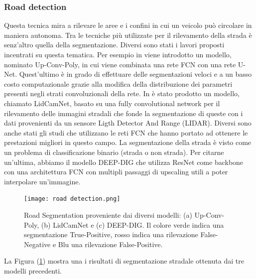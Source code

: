 \subsubsection{Road detection}
Questa tecnica mira a rilevare le aree e i confini in cui un veicolo può circolare 
in maniera autonoma. Tra le tecniche più utilizzate per il rilevamento 
della strada è senz'altro quella della segmentazione. Diversi sono stati i 
lavori proposti incentrati su questa tematica. Per esempio in \cite{Up-conv-Poly} viene 
introdotto un modello, nominato Up-Conv-Poly, in cui viene combinata una 
rete FCN con una rete U-Net. Quest'ultimo è in grado di effettuare delle 
segmentazioni veloci e a un basso costo computazionale grazie alla modifica 
della distribuzione dei parametri presenti negli strati convoluzionali della 
rete. In \cite{CALTAGIRONE2019125} è stato prodotto un modello, chiamato LidCamNet, basato su 
una fully convolutional network per il rilevamento delle immagini stradali 
che fonde la segmentazione di queste con i dati provenienti da un sensore 
Ligth Detector And Range (LIDAR). Diversi sono anche stati gli studi che 
utilizzano le reti FCN che hanno portato ad ottenere le prestazioni migliori 
in questo campo. La segmentazione della strada è visto come un problema di 
classificazione binario (strada o non strada). Per citarne un'ultima, abbiamo 
il modello DEEP-DIG \cite{DEEP-DIG} che utilizza ResNet come backbone con una 
architettura FCN con multipli passaggi di upscaling utili a poter interpolare 
un'immagine. 
\begin{figure}
    \centering
    \texttt{[image: road detection.png]}
    \centering
    \caption{Road Segmentation proveniente dai diversi modelli: (a) Up-Conv-Poly, (b) LidCamNet e (c) DEEP-DIG. Il colore verde indica una segmentazione True-Positive, rosso indica una rilevazione False-Negative e Blu una rilevazione False-Positive.}
    \label{road-det}
\end{figure}
La Figura (\ref{road-det}) mostra una i risultati di segmentazione stradale ottenuta 
dai tre modelli precedenti.


